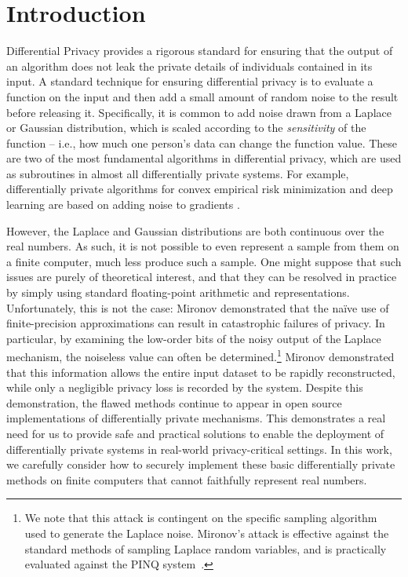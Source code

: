 \documentclass{jpc}
\begin{document}
\maketitle

\section{Introduction}
Differential Privacy \citep{DworkMNS06} provides a rigorous standard for ensuring that the output of an algorithm does not leak the private details of individuals contained in its input. A standard technique for ensuring differential privacy is to evaluate a function on the input and then add a small amount of random noise to the result before releasing it. Specifically, it is common to add noise drawn from a Laplace or Gaussian distribution, which is scaled according to the \emph{sensitivity} of the function -- i.e., how much one person's data can change the function value. These are two of the most fundamental algorithms in differential privacy, which are used as subroutines in almost all differentially private systems. For example, differentially private algorithms for convex empirical risk minimization and deep learning are based on adding noise to gradients \citep{BassilyST14,AbadiCGMMTZ16}.

However, the Laplace and Gaussian distributions are both continuous over the real numbers. As such, it is not possible to even represent a sample from them on a finite computer, much less produce such a sample. One might suppose that such issues are purely of theoretical interest, and that they can be resolved in practice by simply using standard floating-point arithmetic and representations. Unfortunately, this is not the case: Mironov \cite{Mironov12} demonstrated that the na\"ive use of finite-precision approximations can result in catastrophic failures of privacy. In particular, by examining the low-order bits of the noisy output of the Laplace mechanism, the noiseless value can often be determined.\footnote{We note that this attack is contingent on the specific sampling algorithm used to generate the Laplace noise. Mironov's attack is effective 
 against the standard methods of sampling Laplace random variables, and is practically evaluated against the PINQ system~\cite{McSherry09}.} Mironov demonstrated that this information allows the entire input dataset to be rapidly reconstructed, while only a negligible privacy loss is recorded by the system. 
Despite this demonstration, the flawed methods continue to appear in open source implementations of differentially private mechanisms. This demonstrates a real need for us to provide safe and practical solutions to enable the deployment of differentially private systems in real-world privacy-critical settings. In this work, we carefully consider how to securely implement these basic differentially private methods on finite computers that cannot faithfully represent real numbers. 
\end{document}
